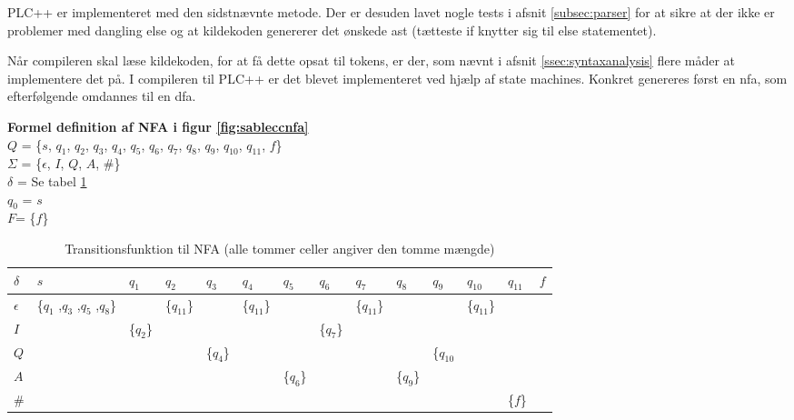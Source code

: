 \noindent PLC++ er implementeret med den sidstnævnte metode. Der er desuden lavet nogle tests i afsnit \ref{subsec:parser} for at sikre at der ikke er problemer med dangling else og at kildekoden genererer det ønskede \gls{ast} (tætteste if knytter sig til else statementet).

\noindent Når compileren skal læse kildekoden, for at få dette opsat til tokens, er der, som nævnt i afsnit \ref{ssec:syntaxanalysis} flere måder at implementere det på. I compileren til PLC++ er det blevet implementeret ved hjælp af state machines. Konkret genereres først en \gls{nfa}, som efterfølgende omdannes til en \gls{dfa}.


\noindent \textbf{Formel definition af NFA i figur \ref{fig:sableccnfa}}\\
\noindent $Q$ = \{$s$, $q_1$, $q_2$, $q_3$, $q_4$, $q_5$, $q_6$, $q_7$, $q_8$, $q_9$, $q_{10}$, $q_{11}$, $f$\}\\
\noindent $\Sigma$ = \{$\epsilon$, $I$, $Q$, $A$, $\#$\}\\
\noindent $\delta$ = Se tabel \ref{tab:nfadelta}\\
\noindent $q_0$ = $s$\\
\noindent $F$= \{$f$\}\\


\begin{table}[H]
\centering
\footnotesize
{}
\begin{tabular}{l@{\hskip\tabcolsep\vrule width 1pt\hskip\tabcolsep}l|l|l|l|l|l|l|l|l|l|l|l|l}

$\delta$         & $s$              & $q_{1}$ & $q_{2}$ & $q_{3}$ & $q_{4}$ & $q_{5}$ & $q_{6}$ & $q_{7}$ & $q_{8}$ & $q_{9}$ & $q_{10}$ & $q_{11}$ & $f$ \\ \bottomrule
$\epsilon$ & \{$q_{1}$ ,$q_{3}$ ,$q_{5}$ ,$q_{8}$\} &   & \{$q_{11}$\} &   & \{$q_{11}$\} & & & \{$q_{11}$\} & & & \{$q_{11}$\} & &\\ 
$I$ & & \{$q_2$\} & &       & &       & \{$q_7$\} & &       &          & &     & \\ 
$Q$ & &       & & \{$q_4$\} & &       &       & &       & \{$q_{10}$ & &     & \\ 
$A$ & &       & &       & & \{$q_6$\} &       & & \{$q_9$\} &          & &     & \\ 
\#  & &       & &       & &       &       & &       &          & & \{$f$\} & \\
\end{tabular}
	\caption{Transitionsfunktion til NFA (alle tommer celler angiver den tomme mængde)}
    \label{tab:nfadelta}
\end{table}

